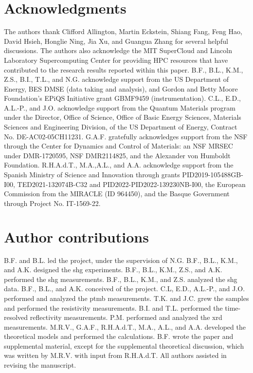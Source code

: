 \section{Acknowledgments}

The authors thank Clifford Allington, Martin Eckstein, Shiang Fang, Feng Hao, David Hsieh, Honglie Ning, Jia Xu, and Guangua Zhang for several helpful discussions.
The authors also acknowledge the MIT SuperCloud and Lincoln Laboratory Supercomputing Center for providing HPC resources that have contributed to the research results reported within this paper.
B.F., B.L., K.M., Z.S., B.I., T.L., and N.G. acknowledge support from the US Department of Energy, BES DMSE (data taking and analysis), and Gordon and Betty Moore Foundation’s EPiQS Initiative grant GBMF9459 (instrumentation).
C.L., E.D., A.L.-P., and J.O. acknowledge support from the Quantum Materials program under the Director, Office of Science, Office of Basic Energy Sciences, Materials Sciences and Engineering Division, of the US Department of Energy, Contract No. DE-AC02-05CH11231.
G.A.F. gratefully acknowledges support from the NSF through the Center for Dynamics and Control of Materials: an NSF MRSEC under DMR-1720595, NSF DMR2114825, and the Alexander von Humboldt Foundation.
R.H.A.d.T., M.A.,A.L., and A.A. acknowledge support from the Spanish Ministry of Science and Innovation through grants PID2019-105488GB-I00, TED2021-132074B-C32 and PID2022-PID2022-139230NB-I00, the European Commission from the MIRACLE (ID 964450), and the Basque Government through Project No. IT-1569-22.

\section{Author contributions}
B.F. and B.L. led the project, under the supervision of N.G.
B.F., B.L., K.M., and A.K. designed the \gls{shg} experiments.
B.F., B.L., K.M., Z.S., and A.K. performed the \gls{shg} measurements.
B.F., B.L., K.M., and Z.S. analyzed the \gls{shg} data.
B.F., B.L., and A.K. conceived of the project.
C.L, E.D., A.L.-P., and J.O. performed and analyzed the \gls{ptmb} measurements.
T.K. and J.C. grew the samples and performed the resistivity measurements.
B.I. and T.L. performed the time-resolved reflectivity measurements.
P.M. performed and analyzed the \gls{xrd} measurements.
M.R.V., G.A.F., R.H.A.d.T., M.A., A.L., and A.A. developed the theoretical models and performed the calculations.
B.F. wrote the paper and supplemental material, except for the supplemental theoretical discussion, which was written by M.R.V. with input from R.H.A.d.T.
All authors assisted in revising the manuscript.

